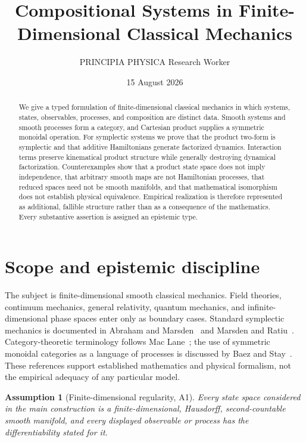 \documentclass[11pt]{article}
\title{Compositional Systems in Finite-Dimensional Classical Mechanics}
\author{PRINCIPIA PHYSICA Research Worker}
\date{15 August 2026}
\newtheorem{assumption}[definition]{Assumption}
\begin{document}
\maketitle

\begin{abstract}
We give a typed formulation of finite-dimensional classical mechanics in which systems, states, observables, processes, and composition are distinct data. Smooth systems and smooth processes form a category, and Cartesian product supplies a symmetric monoidal operation. For symplectic systems we prove that the product two-form is symplectic and that additive Hamiltonians generate factorized dynamics. Interaction terms preserve kinematical product structure while generally destroying dynamical factorization. Counterexamples show that a product state space does not imply independence, that arbitrary smooth maps are not Hamiltonian processes, that reduced spaces need not be smooth manifolds, and that mathematical isomorphism does not establish physical equivalence. Empirical realization is therefore represented as additional, fallible structure rather than as a consequence of the mathematics. Every substantive assertion is assigned an epistemic type.
\end{abstract}

\section{Scope and epistemic discipline}

The subject is finite-dimensional smooth classical mechanics. Field theories, continuum mechanics, general relativity, quantum mechanics, and infinite-dimensional phase spaces enter only as boundary cases. Standard symplectic mechanics is documented in Abraham and Marsden~\cite{AbrahamMarsden1978} and Marsden and Ratiu~\cite{MarsdenRatiu1999}. Category-theoretic terminology follows Mac Lane~\cite{MacLane1998}; the use of symmetric monoidal categories as a language of processes is discussed by Baez and Stay~\cite{BaezStay2011}. These references support established mathematics and physical formalism, not the empirical adequacy of any particular model.

\begin{assumption}[Finite-dimensional regularity, A1]
Every state space considered in the main construction is a finite-dimensional, Hausdorff, second-countable smooth manifold, and every displayed observable or process has the differentiability stated for it.
\end{assumption}
\end{document}
